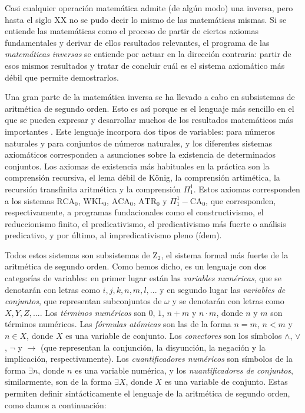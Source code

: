 \documentclass[11pt,a4paper]{book}
\theoremstyle{plain}
\theoremstyle{definition}
\theoremstyle{remark}
\begin{document}
Casi cualquier operación matemática admite (de algún modo) una inversa, pero hasta el siglo XX no se pudo decir lo mismo de las matemáticas mismas. Si se entiende las matemáticas como el proceso de partir de ciertos axiomas fundamentales y derivar de ellos resultados relevantes, el programa de las \textit{matemáticas inversas} se entiende por actuar en la dirección contraria: partir de esos mismos resultados y tratar de concluir cuál es el sistema axiomático más débil que permite demostrarlos.

Una gran parte de la matemática inversa se ha llevado a cabo en subsistemas de aritmética de segundo orden. Esto es así porque es el lenguaje más sencillo en el que se pueden expresar y desarrollar muchos de los resultados matemáticos más importantes \parencite[p. VIII]{Simpson2006}. Este lenguaje incorpora dos tipos de variables: para números naturales y para conjuntos de números naturales, y los diferentes sistemas axiomáticos corresponden a asunciones sobre la existencia de determinados conjuntos. Los axiomas de existencia más habituales en la práctica son la comprensión recursiva, el lema débil de König, la comprensión artimética, la recursión transfinita aritmética y la comprensión $\Pi^1_1$. Estos axiomas corresponden a los sistemas $\mathrm{RCA}_0$, $\mathrm{WKL}_0$, $\mathrm{ACA}_0$, $\mathrm{ATR}_0$ y $\Pi^1_1-\mathrm{CA}_0$, que corresponden, respectivamente, a programas fundacionales como el constructivismo, el reduccionismo finito, el predicativismo, el predicativismo más fuerte o análisis predicativo, y por último, al impredicativismo pleno (ídem).

Todos estos sistemas son subsistemas de $\mathrm{Z}_2$, el sistema formal más fuerte de la aritmética de segundo orden. Como hemos dicho, es un lenguaje con dos categorías de variables: en primer lugar están las \textit{variables numéricas}, que se denotarán con letras como $i,j,k,n,m,l,...$ y en segundo lugar las \textit{variables de conjuntos}, que representan subconjuntos de $\omega$ y se denotarán con letras como $X,Y,Z,...$. Los \textit{términos numéricos} son $0$, $1$, $n+m$ y $n \cdot m$, donde $n$ y $m$ son términos numéricos. Las \textit{fórmulas atómicas} son las de la forma $n = m$, $n<m$ y $n \in X$, donde $X$ es una variable de conjunto. Los \textit{conectores} son los símbolos $\wedge$, $\vee $, $\neg$ y $\rightarrow$ (que representan la conjunción, la disyunción, la negación y la implicación, respectivamente). Los \textit{cuantificadores numéricos} son símbolos de la forma $\exists n$, donde $n$ es una variable numérica, y los \textit{nuantificadores de conjuntos}, similarmente, son de la forma $\exists X$, donde $X$ es una variable de conjunto. Estas permiten definir sintácticamente el lenguaje de la aritmética de segundo orden, como damos a continuación:
\end{document}
